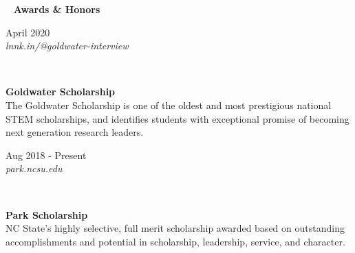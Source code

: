 \documentclass[7.5pt]{article}
\def \primarycolor   {spacecadet}
\def \tertiarycolor  {airforceblue} %
\def \titlerectmin{0.15cm}
\def \titlerectmax{0.35cm}
\def \leftcolwidth{3.10cm}
\def\code#1{\texttt{#1}}
\newcommand{\CPP}
{\code{C\nolinebreak[4]\hspace{-.05em}\raisebox{.22ex}{\footnotesize\bf ++}}}
\newcommand{\cvheader}[1]{
    \tikz{\fill [\primarycolor] (0,\titlerectmin) rectangle (\leftcolwidth,\titlerectmax);} \ 
    \textcolor{\primarycolor}{ \large{\textbf{#1}} } 
}
\newcommand{\cventry}[4]{
    \begin{minipage}[t]{\leftcolwidth} 
        \small{
            \begin{flushright}
                #2\\
                \textcolor{\tertiarycolor}{\textit{#4}}
            \end{flushright}
        }
    \end{minipage} \ \
    \begin{minipage}[t]{\linewidth-\leftcolwidth} \normalsize{\textbf{#1} \\ #3} \end{minipage}
} %
\begin{document}
\cvheader{Awards \& Honors}

\cventry{Goldwater Scholarship}{April 2020}{The Goldwater Scholarship is one of the oldest and most prestigious national STEM scholarships, and identifies students with exceptional promise of becoming next generation research leaders.}{lnnk.in/@goldwater-interview}

\cventry{Park Scholarship}{Aug 2018 - Present}{NC State's highly selective, full merit scholarship awarded based on outstanding accomplishments and potential in scholarship, leadership, service, and character.}{park.ncsu.edu}

\end{document}
